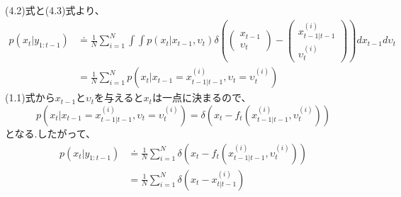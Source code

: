 \documentclass[dvipdfmx,uplatex,10pt]{jsarticle}
\begin{document}
(4.2)式と(4.3)式より、
\begin{align}
  p(x_{t}|y_{1:t-1})
  &\doteq
  \frac{1}{N}\sum_{i=1}^{N}\int \int p(x_{t}|x_{t-1},\upsilon_{t})\delta\left(
	\left(
\begin{array}{c}
  x_{t-1}\\
  \upsilon_{t}
\end{array}
  \right)
  -\left(
	\begin{array}{c}
	x_{t-1|t-1}^{(i)}\\
	\upsilon_{t}^{(i)}
  \end{array}
  \right)
\right)dx_{t-1}d\upsilon_{t}\nonumber\\
&=\frac{1}{N}\sum_{i=1}^{N}p\left(x_{t}|x_{t-1}=x_{t-1|t-1}^{(i)},\upsilon_{t}=\upsilon_{t}^{(i)}\right)
\end{align}
(1.1)式から$x_{t-1}$と$\upsilon_{t}$を与えると$x_{t}$は一点に決まるので、
\begin{equation}
p\left(x_{t}|x_{t-1}=x_{t-1|t-1}^{(i)},\upsilon_{t}=\upsilon_{t}^{(i)}\right)
=\delta\left(x_{t}-f_{t}(x_{t-1|t-1}^{(i)},\upsilon_{t}^{(i)}) \right)
\end{equation}
となる.したがって、
\begin{align}
  p(x_{t}|y_{1:t-1})
  &\doteq \frac{1}{N}\sum_{i=1}^{N}\delta\left(x_{t}-f_{t}(x_{t-1|t-1}^{(i)},\upsilon_{t}^{(i)}) \right)\nonumber\\
  &= \frac{1}{N}\sum_{i=1}^{N}\delta(x_{t}-x_{t|t-1}^{(i)})
\end{align}
\end{document}

